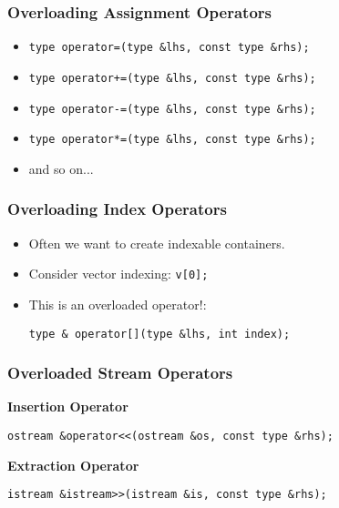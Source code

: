\documentclass{beamer}
\begin{document}
\begin{frame}[fragile]
    \frametitle{Overloading Assignment Operators}
    \begin{itemize}
        \item \begin{verbatim}
type operator=(type &lhs, const type &rhs);\end{verbatim}
        \item \begin{verbatim}
type operator+=(type &lhs, const type &rhs);\end{verbatim}
        \item \begin{verbatim}
type operator-=(type &lhs, const type &rhs);\end{verbatim}
        \item \begin{verbatim}
type operator*=(type &lhs, const type &rhs);\end{verbatim}
        \item and so on...
    \end{itemize}
\end{frame}

\begin{frame}[fragile]
    \frametitle{Overloading Index Operators}
    \begin{itemize}[<+->]
        \item Often we want to create indexable containers. 
        \item Consider vector indexing: {\tt v[0];}
        \item This is an overloaded operator!:
        \begin{verbatim}
type & operator[](type &lhs, int index);
        \end{verbatim}
    \end{itemize}
\end{frame}

\begin{frame}[fragile]
    \frametitle{Overloaded Stream Operators}
    {\bf Insertion Operator}
    \begin{verbatim}
ostream &operator<<(ostream &os, const type &rhs);
    \end{verbatim}
    \vspace{0.10in}
    \par{\bf Extraction Operator}
    \begin{verbatim}
istream &istream>>(istream &is, const type &rhs);
    \end{verbatim}
\end{frame}
\end{document}
